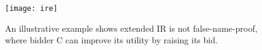 \documentclass{sig-alternate}
\newtheorem{theorem}{Theorem}
\begin{document}
%
%
%
%

\begin{figure}[!t]
\centering
\texttt{[image: ire]}
\caption{An illustrative example shows extended IR is not false-name-proof, where bidder C can improve its utility by raising its bid.}
\label{fig_ir}
\end{figure}




\end{document}
